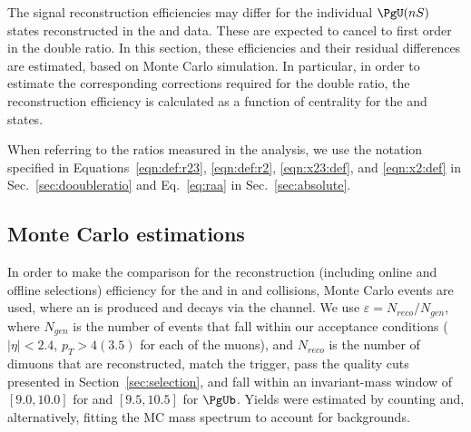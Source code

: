 
The signal reconstruction efficiencies may differ for the individual $\PgU(nS)$ states reconstructed in the \pp and \PbPb data. 
These are expected to cancel to first order in the double ratio. 
In this section, these efficiencies and their residual differences are estimated, based on Monte Carlo simulation.
%
In particular, in order to estimate the corresponding corrections required for the double ratio, the reconstruction efficiency is calculated as a function of centrality for the \PgUa and \PgUb states. 


When referring to the ratios measured in the analysis, we use the notation specified in 
Equations~\ref{eqn:def:r23}, \ref{eqn:def:r2}, \ref{eqn:x23:def}, and \ref{eqn:x2:def} in Sec.~\ref{sec:dooubleratio} and Eq.~\ref{eq:raa} in Sec.~\ref{sec:absolute}.  


\subsection{Monte Carlo estimations}
\label{sec:eff:mc}

In order to make the comparison for the reconstruction (including online and offline selections) efficiency for the \PgUa and \PgUb in \PbPb and \pp collisions, Monte Carlo events are used, where an \PgU is produced and decays via the \mumu channel. We use  $\varepsilon={N_{reco}}/{N_{gen}}$, where $N_{gen}$ is the number of events that fall within our acceptance conditions ($|\eta| < 2.4$, $p_{T} > 4 (3.5)$ for each of the muons),  and $N_{reco}$ is the number of dimuons that are reconstructed, match the trigger, pass the quality cuts presented in Section~\ref{sec:selection}, and fall within an invariant-mass window of $[9.0,10.0]$ for \PgUa and $[9.5,10.5]$ for $\PgUb$. Yields were estimated by counting and, alternatively, fitting the MC mass spectrum to account for backgrounds.  

